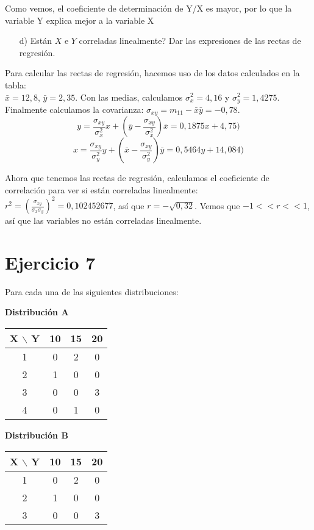 \documentclass[a4paper,12pt]{article}
\begin{document}
Como vemos, el coeficiente de determinación de Y/X es mayor, por lo que la variable Y explica mejor a la variable X\\

\begin{enumerate}
    \item[d)] \textquestiondown Est\'an $X$ e $Y$ correladas linealmente? Dar las expresiones de las rectas de regresi\'on.
\end{enumerate}

Para calcular las rectas de regresión, hacemos uso de los datos calculados en la tabla:\\
$\bar x = 12,8$, $\bar y = 2,35$. Con las medias, calculamos $\sigma_x^2 = 4,16$ y $\sigma_y^2= 1,4275$.
Finalmente calculamos la covarianza: $\sigma_{xy}= m_{11} - \bar x \bar y = -0,78$.\\
\[y = \frac{\sigma_{xy}}{\sigma_x^2}x+(\bar y -\frac{\sigma_{xy}}{\sigma_x^2})\bar x = 0,1875x+4,75)\]
\[x = \frac{\sigma_{xy}}{\sigma_y^2}y+(\bar x -\frac{\sigma_{xy}}{\sigma_y^2})\bar y = 0,5464y+14,084)\]

Ahora que tenemos las rectas de regresión, calculamos el coeficiente de correlación para ver si están correladas linealmente:\\
$r^2=(\frac{\sigma_{xy}}{\sigma_x\sigma_y})^2=0,102452677$, así que $r=-\sqrt{0,32}$. Vemos que $-1<<r<<1$, así que las variables no están correladas linealmente.\\

\section*{Ejercicio 7}
Para cada una de las siguientes distribuciones:

\textbf{Distribución A}
\begin{center}
\begin{tabular}{c|ccc}
X $\backslash$ Y & 10 & 15 & 20 \\
\hline
1 & 0 & 2 & 0 \\
2 & 1 & 0 & 0 \\
3 & 0 & 0 & 3 \\
4 & 0 & 1 & 0 \\
\end{tabular}
\end{center}

\textbf{Distribución B}
\begin{center}
\begin{tabular}{c|ccc}
X $\backslash$ Y & 10 & 15 & 20 \\
\hline
1 & 0 & 2 & 0 \\
2 & 1 & 0 & 0 \\
3 & 0 & 0 & 3 \\
\end{tabular}
\end{center}
\end{document}
